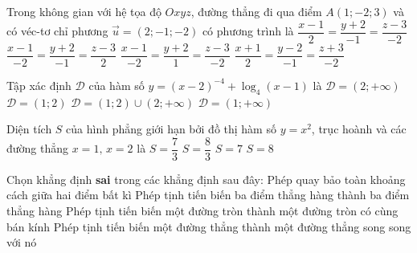 \begin{ex}%
	Trong không gian với hệ tọa độ $Oxyz$, đường thẳng đi qua điểm $A(1;-2;3)$ và có véc-tơ chỉ phương $\overrightarrow{u}=(2;-1;-2)$ có phương trình là
	\choice
	{\True $\dfrac{x-1}{2}=\dfrac{y+2}{-1}=\dfrac{z-3}{-2}$}
	{$\dfrac{x-1}{-2}=\dfrac{y+2}{-1}=\dfrac{z-3}{2}$}
	{$\dfrac{x-1}{-2}=\dfrac{y+2}{1}=\dfrac{z-3}{-2}$}
	{$\dfrac{x+1}{2}=\dfrac{y-2}{-1}=\dfrac{z+3}{-2}$}
\end{ex}
\begin{ex}%
	Tập xác định $\mathscr{D}$ của hàm số $y=(x-2)^{-4}+\log _4(x-1)$ là
	\choice
	{$\mathscr{D}=(2;+\infty)$}
	{$\mathscr{D}=(1;2)$}
	{\True $\mathscr{D}=(1;2)\cup (2;+\infty)$}
	{$\mathscr{D}=(1;+\infty)$}
\end{ex}
\begin{ex}%
	Diện tích $S$ của hình phẳng giới hạn bởi đồ thị hàm số $y=x^2$, trục hoành và các đường thẳng $x=1,\,x=2$ là
	\choice
	{\True $S=\dfrac{7}{3}$}
	{$S=\dfrac{8}{3}$}
	{$S=7$}
	{$S=8$}
\end{ex}
\begin{ex}%
	Chọn khẳng định \textbf{sai} trong các khẳng định sau đây:
	\choice
	{Phép quay bảo toàn khoảng cách giữa hai điểm bất kì}
	{Phép tịnh tiến biến ba điểm thẳng hàng thành ba điểm thẳng hàng}
	{Phép tịnh tiến biến một đường tròn thành một đường tròn có cùng bán kính}
	{\True Phép tịnh tiến biến một đường thẳng thành một đường thẳng song song với nó}
\end{ex}
